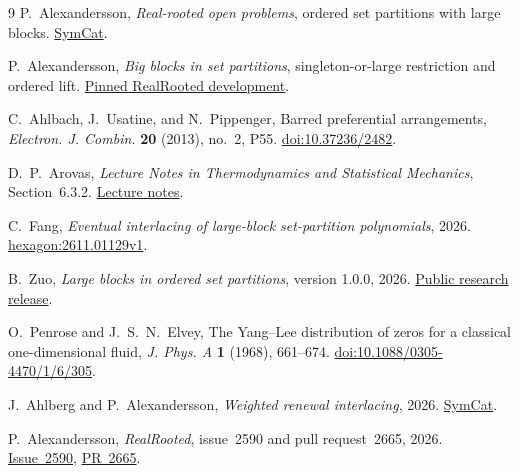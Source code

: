 \documentclass[11pt]{article}
\begin{document}
\begin{thebibliography}{9}
P.~Alexandersson, \emph{Real-rooted open problems}, ordered set partitions with large blocks.
\href{https://www.symmetricfunctions.com/realRootedOpenProblems.htm\#set-partitions-and-trees}{SymCat}.

P.~Alexandersson, \emph{Big blocks in set partitions}, singleton-or-large restriction and ordered lift.
\href{https://github.com/PerAlexandersson/RealRooted/blob/d34c13585e69912d443ecb973d9b78733dd9a052/RealRooted/CombinatorialExamples/BigBlockSingletons.lean}{Pinned RealRooted development}.

C.~Ahlbach, J.~Usatine, and N.~Pippenger, Barred preferential arrangements,
\emph{Electron. J. Combin.} \textbf{20} (2013), no.~2, P55.
\href{https://doi.org/10.37236/2482}{doi:10.37236/2482}.

D.~P.~Arovas, \emph{Lecture Notes in Thermodynamics and Statistical Mechanics}, Section~6.3.2.
\href{https://scalettar.physics.ucdavis.edu/p219a/ArovasStatMechnotes.pdf}{Lecture notes}.

C.~Fang, \emph{Eventual interlacing of large-block set-partition polynomials}, 2026.
\href{https://hexagonmath.org/2611.01129v1}{hexagon:2611.01129v1}.

B.~Zuo, \emph{Large blocks in ordered set partitions}, version 1.0.0, 2026.
\href{https://github.com/AlexZander-666/ordered-partition-large-blocks/releases/tag/v1.0.0}{Public research release}.

O.~Penrose and J.~S.~N.~Elvey, The Yang--Lee distribution of zeros for a classical one-dimensional fluid,
\emph{J. Phys. A} \textbf{1} (1968), 661--674.
\href{https://doi.org/10.1088/0305-4470/1/6/305}{doi:10.1088/0305-4470/1/6/305}.

J.~Ahlberg and P.~Alexandersson, \emph{Weighted renewal interlacing}, 2026.
\href{https://www.symmetricfunctions.com/realRootedInterlacing.htm\#renewal-recurrences-with-a-real-rooted-seed}{SymCat}.

P.~Alexandersson, \emph{RealRooted}, issue~2590 and pull request~2665, 2026.
\href{https://github.com/PerAlexandersson/RealRooted/issues/2590}{Issue~2590},
\href{https://github.com/PerAlexandersson/RealRooted/pull/2665}{PR~2665}.
\end{thebibliography}
\end{document}
